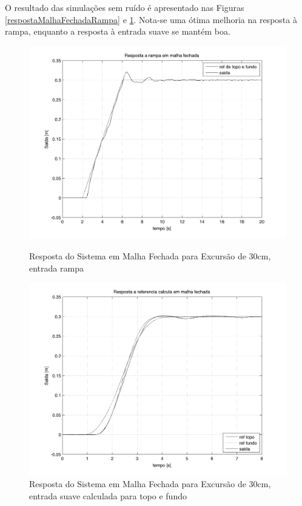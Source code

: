 O resultado das simulações sem ruído é apresentado nas Figuras \ref{respostaMalhaFechadaRampa} e \ref{respostaMalhaFechadaRefTopoFundo}. Nota-se uma ótima melhoria na resposta à rampa, enquanto a resposta à entrada suave se mantém boa.


\begin{figure}[!htb]
    \centering
    \begin{minipage}{.45\textwidth}
        \centering
       
        \includegraphics[width=1\linewidth]{figs/resultados/simulacao/respostaMalhaFechadaRampa}

         \caption{Resposta do Sistema em Malha Fechada para Excursão de 30cm, entrada rampa\label{respostaMalhaFechadaRampa}}
    \end{minipage}%
    \hspace{0.1cm}
    \begin{minipage}{0.45\textwidth}
        \centering
      
        \includegraphics[width=1\linewidth]{figs/resultados/simulacao/respostaMalhaFechadaRefTopoFundo}
        
        \caption{Resposta do Sistema em Malha Fechada para Excursão de 30cm, entrada suave calculada para topo e fundo\label{respostaMalhaFechadaRefTopoFundo}}
    \end{minipage}
\end{figure}

